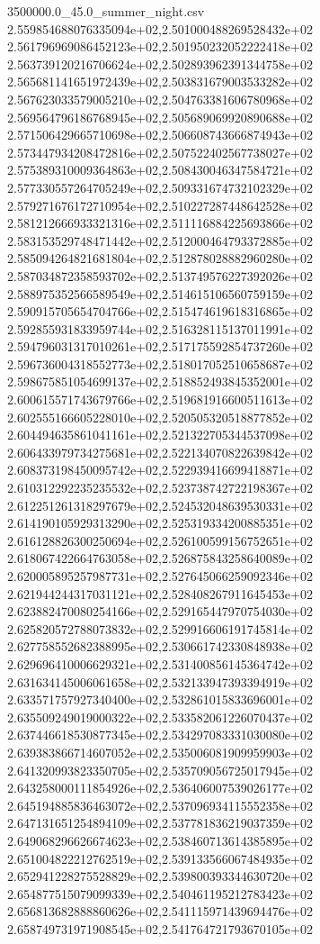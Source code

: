 \begin{filecontents*}{3500000.0_45.0_summer_night.csv}
2.559854688076335094e+02,2.501000488269528432e+02
2.561796969086452123e+02,2.501950232052222418e+02
2.563739120216706624e+02,2.502893962391344758e+02
2.565681141651972439e+02,2.503831679003533282e+02
2.567623033579005210e+02,2.504763381606780968e+02
2.569564796186768945e+02,2.505689069920890688e+02
2.571506429665710698e+02,2.506608743666874943e+02
2.573447934208472816e+02,2.507522402567738027e+02
2.575389310009364863e+02,2.508430046347584721e+02
2.577330557264705249e+02,2.509331674732102329e+02
2.579271676172710954e+02,2.510227287448642528e+02
2.581212666933321316e+02,2.511116884225693866e+02
2.583153529748471442e+02,2.512000464793372885e+02
2.585094264821681804e+02,2.512878028882960280e+02
2.587034872358593702e+02,2.513749576227392026e+02
2.588975352566589549e+02,2.514615106560759159e+02
2.590915705654704766e+02,2.515474619618316865e+02
2.592855931833959744e+02,2.516328115137011991e+02
2.594796031317010261e+02,2.517175592854737260e+02
2.596736004318552773e+02,2.518017052510658687e+02
2.598675851054699137e+02,2.518852493845352001e+02
2.600615571743679766e+02,2.519681916600511613e+02
2.602555166605228010e+02,2.520505320518877852e+02
2.604494635861041161e+02,2.521322705344537098e+02
2.606433979734275681e+02,2.522134070822639842e+02
2.608373198450095742e+02,2.522939416699418871e+02
2.610312292235235532e+02,2.523738742722198367e+02
2.612251261318297679e+02,2.524532048639530331e+02
2.614190105929313290e+02,2.525319334200885351e+02
2.616128826300250694e+02,2.526100599156752651e+02
2.618067422664763058e+02,2.526875843258640089e+02
2.620005895257987731e+02,2.527645066259092346e+02
2.621944244317031121e+02,2.528408267911645453e+02
2.623882470080254166e+02,2.529165447970754030e+02
2.625820572788073832e+02,2.529916606191745814e+02
2.627758552682388995e+02,2.530661742330848938e+02
2.629696410006629321e+02,2.531400856145364742e+02
2.631634145006061658e+02,2.532133947393394919e+02
2.633571757927340400e+02,2.532861015833696001e+02
2.635509249019000322e+02,2.533582061226070437e+02
2.637446618530877345e+02,2.534297083331030080e+02
2.639383866714607052e+02,2.535006081909959903e+02
2.641320993823350705e+02,2.535709056725017945e+02
2.643258000111854926e+02,2.536406007539026177e+02
2.645194885836463072e+02,2.537096934115552358e+02
2.647131651254894109e+02,2.537781836219037359e+02
2.649068296626674623e+02,2.538460713614385895e+02
2.651004822212762519e+02,2.539133566067484935e+02
2.652941228275528829e+02,2.539800393344630720e+02
2.654877515079099339e+02,2.540461195212783423e+02
2.656813682888860626e+02,2.541115971439694476e+02
2.658749731971908545e+02,2.541764721793670105e+02

\end{filecontents*}
